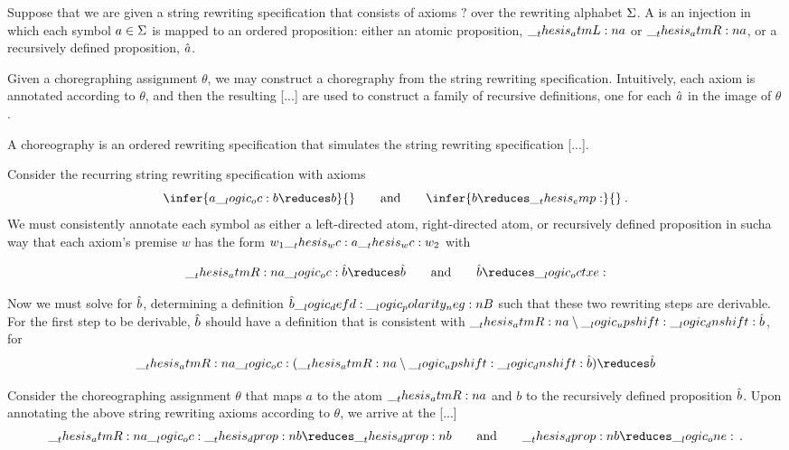 Suppose that we are given a string rewriting specification that consists of axioms $?$ over the rewriting alphabet $\Sigma$.
A  is an injection in which each symbol $a \in \Sigma$ is mapped to an ordered proposition: either an atomic proposition, $\__thesis_atmL:n {a}$ or $\__thesis_atmR:n {a}$, or a recursively defined proposition, $\hat{a}$.

Given a choregraphing assignment $\theta$, we may construct a choregraphy from the string rewriting specification.
Intuitively, each axiom is annotated according to $\theta$, and then the resulting [...] are used to construct a family of recursive definitions, one for each $\hat{a}$ in the image of $\theta$.

A choreography is an ordered rewriting specification that simulates the string rewriting specification [...].

Consider the recurring string rewriting specification with axioms
\begin{equation*}
  \infer{a \oc b \reduces b}{}
  \qquad\text{and}\qquad
  \infer{b \reduces \emp}{}
  \:.
\end{equation*}
We must consistently annotate each symbol as either a left-directed atom, right-directed atom, or recursively defined proposition in sucha way that each axiom's premise $w$ has the form $w_1 \wc a \wc w_2$ with 

\begin{equation*}
  \atmR{a} \oc \defp{b} \reduces \defp{b}
  \qquad\text{and}\qquad
  \defp{b} \reduces \octxe
\end{equation*}

Now we must solve for $\hat{b}$, determining a definition $\hat{b} \__logic_defd: \__logic_polarity_neg:n {B}$ such that these two rewriting steps are derivable.
For the first step to be derivable, $\hat{b}$ should have a definition that is consistent with $\__thesis_atmR:n {a} \mathbin { \setminus } \__logic_upshift: \__logic_dnshift: \hat{b}$, for 
\begin{equation*}
  \atmR{a} \oc (\atmR{a} \limp \up \dn \defp{b}) \reduces \defp{b}
\end{equation*}

Consider the choreographing assignment $\theta$ that maps $a$ to the atom $\__thesis_atmR:n {a}$ and $b$ to the recursively defined proposition $\hat{b}$.
Upon annotating the above string rewriting axioms according to $\theta$, we arrive at the [...]
\begin{equation*}
  \atmR{a} \oc \dprop{b} \reduces \dprop{b}
  \qquad\text{and}\qquad
  \dprop{b} \reduces \one
  \,.
\end{equation*}

